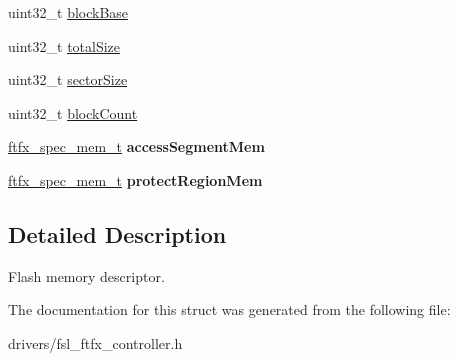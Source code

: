 \begin{DoxyCompactItemize}
\begin{tabbing}
\end{tabbing}\item 
uint32\+\_\+t \mbox{\hyperlink{group__ftfx__controller_ga1cd6b415d1fb5e98f12125b7863691e2}{block\+Base}}
\item 
uint32\+\_\+t \mbox{\hyperlink{group__ftfx__controller_gafd8a6a01e3b212857df6efb82e06f682}{total\+Size}}
\item 
uint32\+\_\+t \mbox{\hyperlink{group__ftfx__controller_ga0531bf8e2d0ac7dbf0d6af9b74a6ae0f}{sector\+Size}}
\item 
uint32\+\_\+t \mbox{\hyperlink{group__ftfx__controller_ga359235f8ff745acf36826f7859097c4f}{block\+Count}}
\item 
\mbox{\hyperlink{group__ftfx__controller_ga6a3bd19cb0ff32d44e464562765a8127}{ftfx\+\_\+spec\+\_\+mem\+\_\+t}} {\bfseries access\+Segment\+Mem}
\item 
\mbox{\hyperlink{group__ftfx__controller_ga6a3bd19cb0ff32d44e464562765a8127}{ftfx\+\_\+spec\+\_\+mem\+\_\+t}} {\bfseries protect\+Region\+Mem}
\end{DoxyCompactItemize}


\subsection{Detailed Description}
Flash memory descriptor. 

The documentation for this struct was generated from the following file\+:\begin{DoxyCompactItemize}
\item 
drivers/fsl\+\_\+ftfx\+\_\+controller.\+h\end{DoxyCompactItemize}
